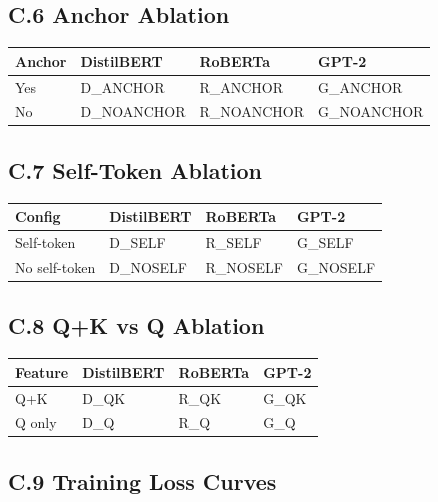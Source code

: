 \subsection{C.6 Anchor Ablation}

\begin{table}[H]
\centering
\small
\begin{tabular}{llll}
\toprule
\textbf{Anchor} & \textbf{DistilBERT} & \textbf{RoBERTa} & \textbf{GPT-2} \\
\midrule
Yes & {{D\_ANCHOR}} & {{R\_ANCHOR}} & {{G\_ANCHOR}} \\
No & {{D\_NOANCHOR}} & {{R\_NOANCHOR}} & {{G\_NOANCHOR}} \\
\bottomrule
\end{tabular}
\end{table}

\subsection{C.7 Self-Token Ablation}

\begin{table}[H]
\centering
\small
\begin{tabular}{llll}
\toprule
\textbf{Config} & \textbf{DistilBERT} & \textbf{RoBERTa} & \textbf{GPT-2} \\
\midrule
Self-token & {{D\_SELF}} & {{R\_SELF}} & {{G\_SELF}} \\
No self-token & {{D\_NOSELF}} & {{R\_NOSELF}} & {{G\_NOSELF}} \\
\bottomrule
\end{tabular}
\end{table}

\subsection{C.8 Q+K vs Q Ablation}

\begin{table}[H]
\centering
\small
\begin{tabular}{llll}
\toprule
\textbf{Feature} & \textbf{DistilBERT} & \textbf{RoBERTa} & \textbf{GPT-2} \\
\midrule
Q+K & {{D\_QK}} & {{R\_QK}} & {{G\_QK}} \\
Q only & {{D\_Q}} & {{R\_Q}} & {{G\_Q}} \\
\bottomrule
\end{tabular}
\end{table}

\subsection{C.9 Training Loss Curves}

